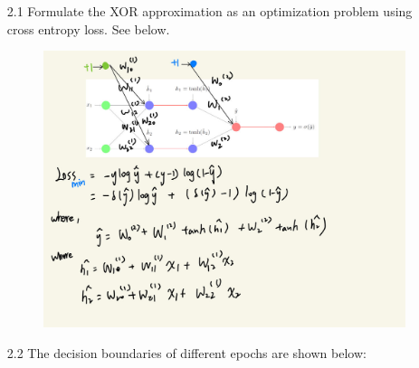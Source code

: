 \documentclass{article}
\begin{document}
    \begin{enumerate}
    	\item[2.1] Formulate the XOR approximation as an optimization problem using cross entropy loss. See below.
    	 \begin{figure}[H]
     	\centering
         	\includegraphics[width=\textwidth]
         	{optimization.jpg}
     	\end{figure}
     	
    	\item[2.2] 
        The decision boundaries of different epochs are shown below:\\
        \begin{figure}[H]
        

\end{figure}
\end{enumerate}
\end{document}
